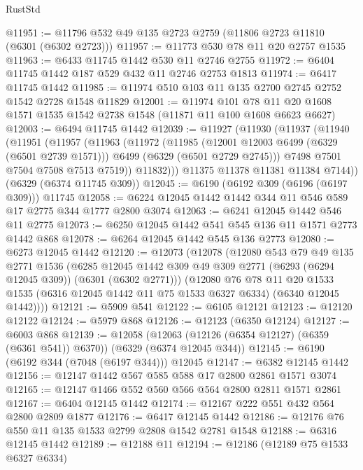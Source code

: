 \begin{lexlean}{RustStd}
\begin{coremodule}
{\begin{coremodule}
{{{{{{{{{{{{{{{{{{{{{{{{{{{{{{{{{{{@11951 := @11796 @532 @49 @135 @2723 @2759 (@11806 @2723 @11810 (@6301 (@6302 @2723)))
@11957 := @11773 @530 @78 @11 @20 @2757 @1535
@11963 := @6433 @11745 @1442 @530 @11 @2746 @2755
@11972 := @6404 @11745 @1442 @187 @529 @432 @11 @2746 @2753 @1813
@11974 := @6417 @11745 @1442
@11985 := @11974 @510 @103 @11 @135 @2700 @2745 @2752 @1542 @2728 @1548 @11829
@12001 := @11974
    @101
    @78
    @11
    @20
    @1608
    @1571
    @1535
    @1542
    @2738
    @1548
    (@11871 @11 @100 @1608 @6623 @6627)
@12003 := @6494 @11745 @1442
@12039 := @11927
    (@11930
      (@11937
        (@11940
          (@11951
            (@11957
              (@11963
                (@11972
                  (@11985
                    (@12001 @12003 @6499 (@6329 (@6501 @2739 @1571)))
                    @6499
                    (@6329 (@6501 @2729 @2745)))
                  @7498
                  @7501
                  @7504
                  @7508
                  @7513
                  @7519))
              @11832)))
        @11375
        @11378
        @11381
        @11384
        @7144))
    (@6329 (@6374 @11745 @309))
@12045 := @6190 (@6192 @309 (@6196 (@6197 @309))) @11745
@12058 := @6224 @12045 @1442 @1442 @344 @11 @546 @589 @17 @2775 @344 @1777 @2800 @3074
@12063 := @6241 @12045 @1442 @546 @11 @2775
@12073 := @6250 @12045 @1442 @541 @545 @136 @11 @1571 @2773 @1442 @868
@12078 := @6264 @12045 @1442 @545 @136 @2773
@12080 := @6273 @12045 @1442
@12120 := @12073
    (@12078
      (@12080
        @543
        @79
        @49
        @135
        @2771
        @1536
        (@6285 @12045 @1442 @309 @49 @309 @2771 (@6293 (@6294 @12045 @309)) (@6301 (@6302 @2771)))
        (@12080
          @76
          @78
          @11
          @20
          @1533
          @1535
          (@6316 @12045 @1442 @11 @75 @1533 @6327 @6334)
          (@6340 @12045 @1442))))
@12121 := @5909 @541
@12122 := @6105 @12121
@12123 := @12120 @12122
@12124 := @5979 @868
@12126 := @12123 (@6350 @12124)
@12127 := @6003 @868
@12139 := @12058
    (@12063 (@12126 (@6354 @12127) (@6359 (@6361 @541)) @6370))
    (@6329 (@6374 @12045 @344))
@12145 := @6190 (@6192 @344 (@7048 (@6197 @344))) @12045
@12147 := @6382 @12145 @1442
@12156 := @12147 @1442 @567 @585 @588 @17 @2800 @2861 @1571 @3074
@12165 := @12147 @1466 @552 @560 @566 @564 @2800 @2811 @1571 @2861
@12167 := @6404 @12145 @1442
@12174 := @12167 @222 @551 @432 @564 @2800 @2809 @1877
@12176 := @6417 @12145 @1442
@12186 := @12176 @76 @550 @11 @135 @1533 @2799 @2808 @1542 @2781 @1548
@12188 := @6316 @12145 @1442
@12189 := @12188 @11
@12194 := @12186 (@12189 @75 @1533 @6327 @6334)
}}}}}}}}}}}}}}}}}}}}}}}}}}}}}}}}}}}
\end{coremodule}}
\end{coremodule}
\end{lexlean}
